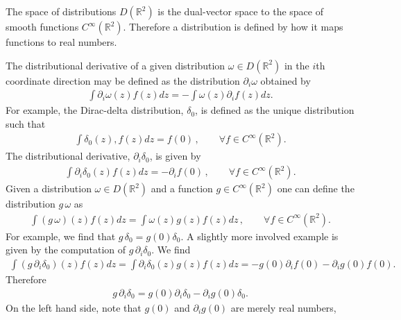\documentclass[12pt]{amsart}
\newcommand{\R}{\ensuremath{\mathbb{R}}}
\theoremstyle{remark}
\begin{document}
The space of distributions $D(\R^2)$ is the dual-vector space to the space of smooth functions $C^\infty(\R^2)$.
Therefore a distribution is defined by how it maps functions to real numbers.

The distributional derivative of a given distribution $\omega \in D(\R^2)$ in the $i$th coordinate direction may be defined as the distribution $\partial_i \omega$ obtained by
\begin{align*}
	\int \partial_i \omega (z) f(z) dz = - \int \omega(z) \partial_i f (z) dz.
\end{align*}
For example, the Dirac-delta distribution, $\delta_0$, is defined as the unique distribution such that
\begin{align*}
	\int \delta_0(z) , f (z) dz = f(0) \,,\quad \quad \forall f \in C^\infty(\R^2).
\end{align*}
The distributional derivative, $\partial_i \delta_0$, is given by
\begin{align*}
	\int \partial_i \delta_0 (z) f(z) dz = -\partial_i f(0) \,,\quad \quad \forall f \in C^\infty(\R^2).
\end{align*}
Given a distribution $\omega \in D(\R^2)$ and a function $g \in C^\infty(\R^2)$ one can define the
distribution $g \, \omega$ as
\begin{align*}
	\int (g \, \omega)(z)  f(z) dz = \int \omega(z) g(z)f(z) dz \,,\quad \quad \forall f \in C^\infty(\R^2).
\end{align*}
For example, we find that $g \, \delta _0 = g(0) \delta_0$.
A slightly more involved example is given by the computation of $g\, \partial_i \delta_0$.
We find
\begin{align*}
	\int (g \, \partial_i \delta_0) (z)  f(z) dz = \int \partial_i \delta_0(z) g(z)f(z) dz =  - g(0) \partial_i f(0) - \partial_ig(0) f(0).
\end{align*}
Therefore
\begin{align*}
	g \, \partial_i \delta_0 = g(0) \partial_i \delta_0 - \partial_i g(0) \delta_0.
\end{align*}
On the left hand side, note that $g(0)$ and $\partial_i g(0)$ are merely real numbers,
\end{document}
